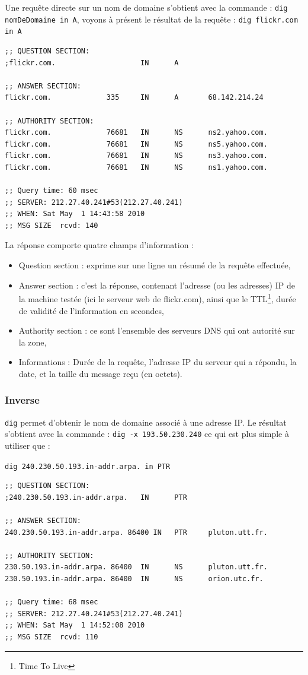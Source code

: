 \documentclass[12pt,a4paper,notitlepage]{article}
\begin{document}
Une requête directe sur un nom de domaine s'obtient avec la commande : \texttt{dig nomDeDomaine in A}, voyons à présent le résultat de la requête : \texttt{dig flickr.com in A}
\begin{lstlisting}[title=Résultat d'une requête directe]
;; QUESTION SECTION:
;flickr.com.                    IN      A

;; ANSWER SECTION:
flickr.com.             335     IN      A       68.142.214.24

;; AUTHORITY SECTION:
flickr.com.             76681   IN      NS      ns2.yahoo.com.
flickr.com.             76681   IN      NS      ns5.yahoo.com.
flickr.com.             76681   IN      NS      ns3.yahoo.com.
flickr.com.             76681   IN      NS      ns1.yahoo.com.

;; Query time: 60 msec
;; SERVER: 212.27.40.241#53(212.27.40.241)
;; WHEN: Sat May  1 14:43:58 2010
;; MSG SIZE  rcvd: 140
\end{lstlisting}

La réponse comporte quatre champs d'information :
\begin{itemize}
\item{Question section :} exprime sur une ligne un résumé de la requête effectuée,
\item{Answer section :} c'est la réponse, contenant l'adresse (ou les adresses) IP de la machine testée (ici le serveur web de flickr.com), ainsi que le TTL\footnote{Time To Live}, durée de validité de l'information en secondes,
\item{Authority section :} ce sont l'ensemble des serveurs DNS qui ont autorité sur la zone,
\item{Informations :} Durée de la requête, l'adresse IP du serveur qui a répondu, la date, et la taille du message reçu (en octets).
\end{itemize}

\subsubsection{Inverse}
 \texttt{dig} permet d'obtenir le nom de domaine associé à une adresse IP. Le résultat s'obtient avec la commande : \texttt{dig -x 193.50.230.240} ce qui est plus simple à utiliser que : 

\noindent \texttt{dig 240.230.50.193.in-addr.arpa. in PTR}\\
\begin{lstlisting}[title=Contenu d'une requête inverse]
;; QUESTION SECTION:
;240.230.50.193.in-addr.arpa.   IN      PTR

;; ANSWER SECTION:
240.230.50.193.in-addr.arpa. 86400 IN   PTR     pluton.utt.fr.

;; AUTHORITY SECTION:
230.50.193.in-addr.arpa. 86400  IN      NS      pluton.utt.fr.
230.50.193.in-addr.arpa. 86400  IN      NS      orion.utc.fr.

;; Query time: 68 msec
;; SERVER: 212.27.40.241#53(212.27.40.241)
;; WHEN: Sat May  1 14:52:08 2010
;; MSG SIZE  rcvd: 110
\end{lstlisting}
\end{document}
